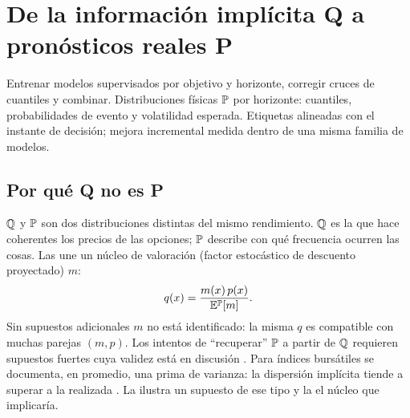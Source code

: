 \clearpage
\section{De la información implícita Q a pronósticos reales P}\label{sec:pronostico}

{Entrenar modelos supervisados por objetivo y horizonte, corregir cruces de cuantiles y combinar.}
{Distribuciones físicas $\P$ por horizonte: cuantiles, probabilidades de evento y volatilidad
esperada.}
{Etiquetas alineadas con el instante de decisión; mejora incremental medida dentro de una misma
familia de modelos.}

\subsection{Por qué Q no es P}\label{sec:qp}

$\Q$ y $\P$ son dos distribuciones distintas del mismo rendimiento. $\Q$ es la que hace coherentes los
precios de las opciones; $\P$ describe con qué frecuencia ocurren las cosas. Las une un núcleo de
valoración (factor estocástico de descuento proyectado) $m$:
\begin{equation}
q(x)=\frac{m(x)\,p(x)}{\E^{\P}[m]}.
\label{eq:nucleo}
\end{equation}
Sin supuestos adicionales $m$ no está identificado: la misma $q$ es compatible con muchas parejas $(m,p)$.
Los intentos de ``recuperar'' $\P$ a partir de $\Q$ requieren supuestos fuertes \citep{ross2015} cuya
validez está en discusión \citep{borovicka2016}. Para índices bursátiles se documenta, en promedio, una
prima de varianza: la dispersión implícita tiende a superar a la realizada \citep{carrwu2009}. La
 ilustra un supuesto de ese tipo y la  el núcleo que implicaría.



